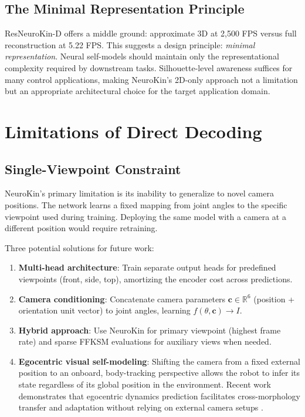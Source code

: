 ﻿\documentclass[12pt,a4paper,oneside]{report}
\begin{document}
\subsection{The Minimal Representation Principle}

ResNeuroKin-D offers a middle ground: approximate 3D at 2,500 FPS versus full reconstruction at 5.22 FPS. This suggests a design principle: \textit{minimal representation}. Neural self-models should maintain only the representational complexity required by downstream tasks. Silhouette-level awareness suffices for many control applications, making NeuroKin's 2D-only approach not a limitation but an appropriate architectural choice for the target application domain.

\section{Limitations of Direct Decoding}

\subsection{Single-Viewpoint Constraint}

NeuroKin's primary limitation is its inability to generalize to novel camera positions. The network learns a fixed mapping from joint angles to the specific viewpoint used during training. Deploying the same model with a camera at a different position would require retraining.

Three potential solutions for future work:

\begin{enumerate}
    \item \textbf{Multi-head architecture}: Train separate output heads for predefined viewpoints (front, side, top), amortizing the encoder cost across predictions.
    \item \textbf{Camera conditioning}: Concatenate camera parameters $\mathbf{c} \in \mathbb{R}^6$ (position + orientation unit vector) to joint angles, learning $f(\theta, \mathbf{c}) \rightarrow I$.
    \item \textbf{Hybrid approach}: Use NeuroKin for primary viewpoint (highest frame rate) and sparse FFKSM evaluations for auxiliary views when needed.
    \item \textbf{Egocentric visual self-modeling}: Shifting the camera from a fixed external position to an onboard, body-tracking perspective allows the robot to infer its state regardless of its global position in the environment. Recent work demonstrates that egocentric dynamics prediction facilitates cross-morphology transfer and adaptation without relying on external camera setups \cite{hu2024egocentric}.
\end{enumerate}
\end{document}
